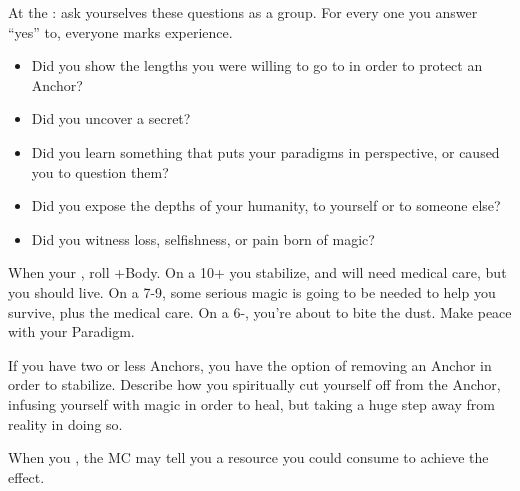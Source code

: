 \begin{multicols}{3}
  \columnbreak

  \begin{move}
    At the : ask yourselves these questions as
    a group. For every one you answer ``yes'' to, everyone marks
    experience.
    \begin{itemize}
      \setlength\itemsep{0em}
    \item Did you show the lengths you were willing to go to in order
      to protect an Anchor?
    \item Did you uncover a secret?
    \item Did you learn something that puts your paradigms in
      perspective, or caused you to question them?
    \item Did you expose the depths of your humanity, to yourself or
      to someone else?
    \item Did you witness loss, selfishness, or pain born of magic?
    \end{itemize}
  \end{move}

  \SEPARATOR
  
  \begin{move}
    When your , roll +Body. On a 10+ you
    stabilize, and will need medical care, but you should live. On a
    7-9, some serious magic is going to be needed to help you survive,
    plus the medical care. On a 6-, you're about to bite the
    dust. Make peace with your Paradigm.

    If you have two or less Anchors, you have the option of removing
    an Anchor in order to stabilize. Describe how you spiritually cut
    yourself off from the Anchor, infusing yourself with magic in
    order to heal, but taking a huge step away from reality in doing
    so.
  \end{move}

  \SEPARATOR

  \begin{move}
    When you , the MC may tell you a
    resource you could consume to achieve the effect.
  \end{move}

\end{multicols}

